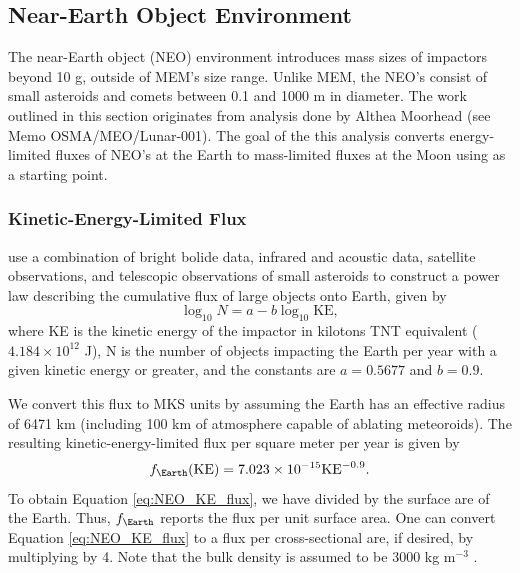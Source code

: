 \documentclass{hitec}
\numberwithin{equation}{section}
\begin{document}

\subsection{Near-Earth Object Environment}\label{ssec:NEO}

The near-Earth object (NEO) environment introduces mass sizes of impactors beyond 10 g, outside of MEM's size range. Unlike MEM, the NEO's consist of small asteroids and comets between 0.1 and 1000 m in diameter. The work outlined in this section originates from analysis done by Althea Moorhead (see Memo OSMA/MEO/Lunar-001). The goal of the this analysis converts energy-limited fluxes of NEO's at the Earth to mass-limited fluxes at the Moon using \cite{brown2002flux} as a starting point.

\subsubsection{Kinetic-Energy-Limited Flux}

\cite{brown2002flux} use a combination of bright bolide data, infrared and acoustic data, satellite observations, and telescopic observations of small asteroids to construct a power law describing the cumulative flux of large objects onto Earth, given by
\begin{equation}
\log_{10}N = a-b\log_{10}\text{KE},
\end{equation}
where KE is the kinetic energy of the impactor in kilotons TNT equivalent ($4.184\times 10^{12}$ J), N is the number of objects impacting the Earth per year with a given kinetic energy or greater, and the constants are $a = 0.5677$ and $b=0.9$.

We convert this flux to MKS units by assuming the Earth has an effective radius of 6471 km (including 100 km of atmosphere capable of ablating meteoroids). The resulting kinetic-energy-limited flux per square meter per year is given by
\begin{equation}\label{eq:NEO_KE_flux}
f_\Earth(\text{KE}) = 7.023\times 10^{-15} \text{KE}^{-0.9}.
\end{equation}
To obtain Equation \eqref{eq:NEO_KE_flux}, we have divided by the surface are of the Earth. Thus, $f_\Earth$ reports the flux per unit surface area. One can convert Equation \eqref{eq:NEO_KE_flux} to a flux per cross-sectional are, if desired, by multiplying by 4. Note that the bulk density is assumed to be 3000 kg m$^{-3}$ \citep{brown2002flux}.
\end{document}
